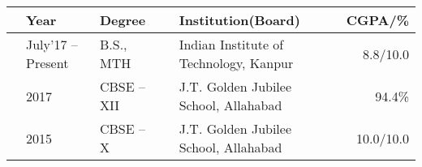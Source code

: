
\newcommand{\education}[4]{
  & #1 & #2 & &#3 & #4
}
\begin{center}
\begin{tabular}{ | L{0.05cm} l | L{3cm} | L{0.05cm} C{8cm} | r |}
  \hline
  \education{\textbf{Year}}{\textbf{Degree}}{\textbf{Institution(Board)}}{\textbf{CGPA/\%}}\\
  \hline
  \education{July'17 -- Present}{B.S., MTH}{Indian Institute of Technology, Kanpur}{8.8/10.0}\\
  \education{2017}{CBSE -- XII}{J.T. Golden Jubilee School, Allahabad}{94.4\%}\\
  \education{2015}{CBSE -- X}{J.T. Golden Jubilee School, Allahabad}{10.0/10.0}\\
  \hline
\end{tabular}
\end{center}
\vspace{-4mm}
